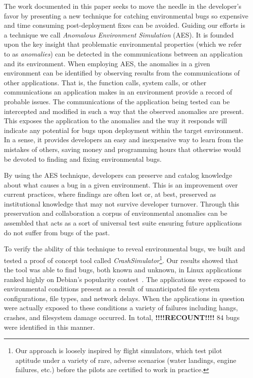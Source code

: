 The work documented in this paper
seeks to move the needle in the developer's favor
by presenting a new technique for catching environmental bugs
so expensive and time consuming post-deployment fixes can be avoided.
Guiding our efforts
is a technique
we call \textit{Anomalous Environment Simulation} (AES).
It is founded upon the key insight
that problematic environmental properties
(which we refer to as \textit{anomalies})
can be detected in the communications
between an application and its environment.
When employing AES,
the anomalies in a given environment
can be identified by
observing results from the communications of other applications.
That is,
the function calls,
system calls,
or other communications an application makes in an environment provide
a record of probable issues.
The communications of the application being tested can be intercepted
and modified in such a way
that the observed anomalies are present.
This exposes the application to the anomalies
and the way it responds
will indicate any potential for bugs upon deployment
within the target environment.
In a sense, it provides developers
an easy and inexpensive way
to learn from the mistakes of others,
saving money and programming hours
that otherwise would be devoted to finding and fixing
environmental bugs.

By using the AES technique,
developers can preserve and catalog
knowledge about what causes a bug
in a given environment.
This is an improvement over current practices,
where findings are often lost or,
at best, preserved as
institutional knowledge
that may not survive developer turnover.
Through this preservation and collaboration
a corpus of environmental anomalies can be assembled
that acts as a sort of universal test suite
ensuring future applications do not suffer from bugs of the past.

To verify the ability of this technique to reveal environmental
bugs, we built and tested a proof of concept tool
called {\em CrashSimulator}\footnote{Our approach is
loosely inspired by flight simulators, which test pilot aptitude under a
variety of rare, adverse scenarios (water landings, engine failures, etc.)
before the pilots are certified to work in practice.}.
Our results showed that the tool was able to find bugs,
both known and unknown,
in Linux applications ranked highly on Debian's popularity
contest~\cite{DebPopCon}.  The applications were exposed to
environmental conditions present as a result of unanticipated
file system configurations, file types, and network delays.
When the applications in
question were actually exposed to these conditions a variety of failures
including hangs, crashes, and filesystem damage occurred.  In total,
\textbf{!!!!RECOUNT!!!!} 84
bugs were identified in this manner.

